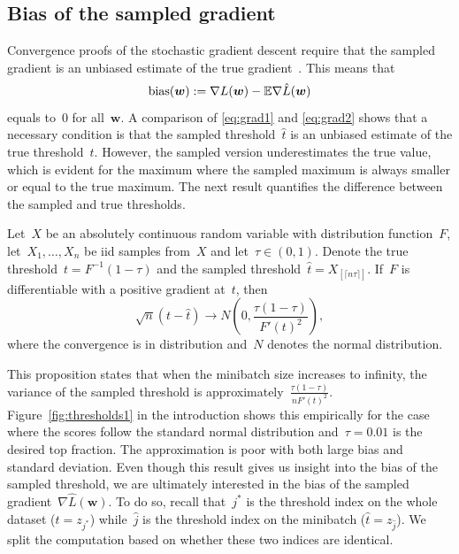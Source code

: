 \subsection{Bias of the sampled gradient}

Convergence proofs of the stochastic gradient descent require that the sampled gradient is an unbiased estimate of the true gradient~\cite{bottou2018optimization}. This means that
\begin{equation}\label{eq:defin_bias}
  \operatorname{bias}(\bm{w}) := \nabla L(\bm{w}) - \mathbb{E} \nabla \hat L(\bm{w})
\end{equation}
equals to~$0$ for all~$\bm{w}$. A comparison of \eqref{eq:grad1} and \eqref{eq:grad2} shows that a necessary condition is that the sampled threshold~$\hat t$ is an unbiased estimate of the true threshold~$t$. However, the sampled version underestimates the true value, which is evident for the maximum where the sampled maximum is always smaller or equal to the true maximum. The next result quantifies the difference between the sampled and true thresholds.

\begin{proposition}\label{proposition:bound}
  Let~$X$ be an absolutely continuous random variable with distribution function~$F$, let~$X_1,\dots,X_n$ be iid samples from~$X$ and let~$\tau\in(0,1)$. Denote the true threshold~$t=F^{-1}(1-\tau)$ and the sampled threshold~$\hat t=X_{[\lceil n\tau\rceil]}$. If~$F$ is differentiable with a positive gradient at~$t$, then
  \begin{equation*}
    \sqrt{n}(t - \hat t) \rightarrow N\left(0, \frac{\tau(1-\tau)}{F'(t)^2}\right),
  \end{equation*}
  where the convergence is in distribution and~$N$ denotes the normal distribution.
\end{proposition}

This proposition states that when the minibatch size increases to infinity, the variance of the sampled threshold is approximately~$\frac{\tau(1-\tau)}{nF'(t)^2}$. Figure~\ref{fig:thresholds1} in the introduction shows this empirically for the case where the scores follow the standard normal distribution and~$\tau=0.01$ is the desired top fraction. The approximation is poor with both large bias and standard deviation. Even though this result gives us insight into the bias of the sampled threshold, we are ultimately interested in the bias of the sampled gradient~$\nabla \hat L(\bm{w})$. To do so, recall that~$j^*$ is the threshold index on the whole dataset ($t=z_{j^*}$) while~$\hat j$ is the threshold index on the minibatch ($\hat t=z_{\hat j}$). We split the computation based on whether these two indices are identical.

